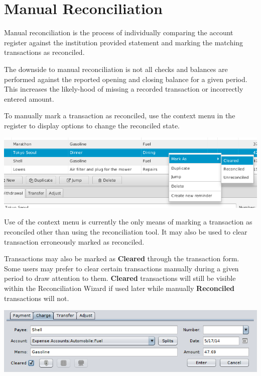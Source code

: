 \documentclass[letterpaper,12pt]{book}
\begin{document}

    \section{Manual Reconciliation}
    Manual reconciliation is the process of individually comparing the account register against the institution provided
    statement and marking the matching transactions as reconciled.

    The downside to manual reconciliation is not all checks and balances are performed against the reported opening and
    closing balance for a given period. This increases the likely-hood of missing a recorded transaction or incorrectly
    entered amount.

    To manually mark a transaction as reconciled, use the context menu in the register to display options to change the
    reconciled state.

    \includegraphics[width=1.0\linewidth]{images/manual-reconcile-context}

    \begin{mdframed}[style=info]
        Use of the context menu is currently the only means of marking a transaction as reconciled other than using the
        reconciliation tool. It may also be used to clear transaction erroneously marked as reconciled.
    \end{mdframed}

    Transactions may also be marked as \textbf{Cleared }through the transaction form.
    Some users may prefer to clear certain transactions manually during a given period to draw attention to them.
    \textbf{Cleared} transactions will still be visible within the Reconciliation Wizard if used later while manually
    \textbf{Reconciled} transactions will not.

    \includegraphics[width=1.0\linewidth]{images/transaction-form}
\end{document}
